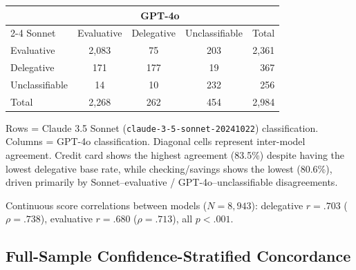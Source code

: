 \begin{table}[H]
\begin{threeparttable}
\begin{small}
\medskip
\begin{tabular}{lcccr}
\toprule
 & \multicolumn{3}{c}{GPT-4o} & \\
\cmidrule(lr){2-4}
Sonnet & Evaluative & Delegative & Unclassifiable & Total \\
\midrule
Evaluative      & 2{,}083 &  75 & 203 & 2{,}361 \\
Delegative      &     171 & 177 &  19 &    367 \\
Unclassifiable  &      14 &  10 & 232 &    256 \\
\midrule
Total           & 2{,}268 & 262 & 454 & 2{,}984 \\
\bottomrule
\end{tabular}
\end{small}
\begin{tablenotes}
\small
\item Rows = Claude 3.5 Sonnet (\texttt{claude-3-5-sonnet-20241022}) classification. Columns = GPT-4o classification. Diagonal cells represent inter-model agreement. Credit card shows the highest agreement (83.5\%) despite having the lowest delegative base rate, while checking/savings shows the lowest (80.6\%), driven primarily by Sonnet--evaluative / GPT-4o--unclassifiable disagreements.
\end{tablenotes}
\end{threeparttable}
\end{table}

Continuous score correlations between models ($N = 8{,}943$): delegative $r = .703$ ($\rho = .738$), evaluative $r = .680$ ($\rho = .713$), all $p < .001$.

\subsection{Full-Sample Confidence-Stratified Concordance}

